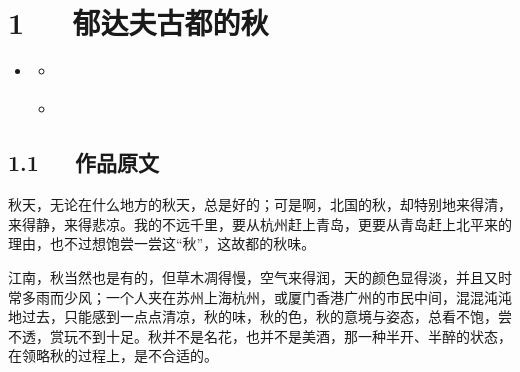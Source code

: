 \documentclass[letterpaper,12pt,english]{sphinxmanual}
\begin{document}
\chapter{1   郁达夫\sphinxhyphen{}古都的秋}
\label{\detokenize{p01_u6563_u6587/_u90c1_u8fbe_u592b-_u53e4_u90fd_u7684_u79cb:id1}}\label{\detokenize{p01_u6563_u6587/_u90c1_u8fbe_u592b-_u53e4_u90fd_u7684_u79cb::doc}}
\begin{sphinxShadowBox}
\begin{itemize}
\item {} 
\label{\detokenize{p01_u6563_u6587/_u90c1_u8fbe_u592b-_u53e4_u90fd_u7684_u79cb:id5}}{\hyperref[\detokenize{p01_u6563_u6587/_u90c1_u8fbe_u592b-_u53e4_u90fd_u7684_u79cb:id1}]{}}
\begin{itemize}
\item {} 
\label{\detokenize{p01_u6563_u6587/_u90c1_u8fbe_u592b-_u53e4_u90fd_u7684_u79cb:id6}}{\hyperref[\detokenize{p01_u6563_u6587/_u90c1_u8fbe_u592b-_u53e4_u90fd_u7684_u79cb:id3}]{}}

\item {} 
\label{\detokenize{p01_u6563_u6587/_u90c1_u8fbe_u592b-_u53e4_u90fd_u7684_u79cb:id7}}{\hyperref[\detokenize{p01_u6563_u6587/_u90c1_u8fbe_u592b-_u53e4_u90fd_u7684_u79cb:id4}]{}}

\end{itemize}

\end{itemize}
\end{sphinxShadowBox}


\section{1.1   作品原文}
\label{\detokenize{p01_u6563_u6587/_u90c1_u8fbe_u592b-_u53e4_u90fd_u7684_u79cb:id3}}
秋天，无论在什么地方的秋天，总是好的；可是啊，北国的秋，却特别地来得清，来得静，来得悲凉。我的不远千里，要从杭州赶上青岛，更要从青岛赶上北平来的理由，也不过想饱尝一尝这“秋”，这故都的秋味。

江南，秋当然也是有的，但草木凋得慢，空气来得润，天的颜色显得淡，并且又时常多雨而少风；一个人夹在苏州上海杭州，或厦门香港广州的市民中间，混混沌沌地过去，只能感到一点点清凉，秋的味，秋的色，秋的意境与姿态，总看不饱，尝不透，赏玩不到十足。秋并不是名花，也并不是美酒，那一种半开、半醉的状态，在领略秋的过程上，是不合适的。
\end{document}
